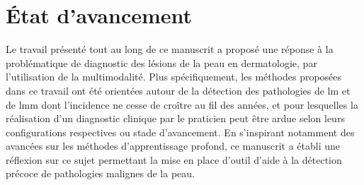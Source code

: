 \renewcommand{\thechapter}{\roman{chapter}}
\setcounter{chapter}{4}
\setcounter{figure}{0}

\label{chap:conclusion}

\section*{État d'avancement}
Le travail présenté tout au long de ce manuscrit a proposé une réponse à la problématique de diagnostic des lésions de la peau en dermatologie, par l'utilisation de la multimodalité. Plus spécifiquement, les méthodes proposées dans ce travail ont été orientées autour de la détection des pathologies de \gls{lm} et de \gls{lmm} dont l'incidence ne cesse de croître au fil des années, et pour lesquelles la réalisation d'un diagnostic clinique par le praticien peut être ardue selon leurs configurations respectives ou stade d'avancement. En s'inspirant notamment des avancées sur les méthodes d'apprentissage profond, ce manuscrit a établi une réflexion sur ce sujet permettant la mise en place d'outil d'aide à la détection précoce de pathologies malignes de la peau.\par

